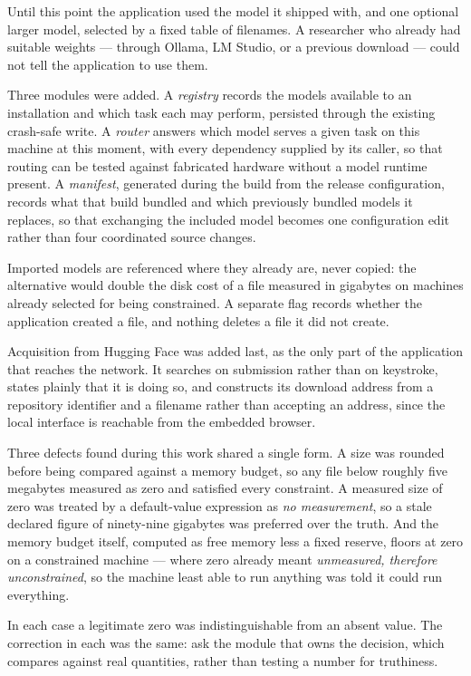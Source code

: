 \documentclass[11pt,a4paper]{article}
\begin{document}
Until this point the application used the model it shipped with, and one
optional larger model, selected by a fixed table of filenames. A researcher who
already had suitable weights --- through Ollama, LM Studio, or a previous
download --- could not tell the application to use them.

Three modules were added. A \emph{registry} records the models available to an
installation and which task each may perform, persisted through the existing
crash-safe write. A \emph{router} answers which model serves a given task on
this machine at this moment, with every dependency supplied by its caller, so
that routing can be tested against fabricated hardware without a model runtime
present. A \emph{manifest}, generated during the build from the release
configuration, records what that build bundled and which previously bundled
models it replaces, so that exchanging the included model becomes one
configuration edit rather than four coordinated source changes.

Imported models are referenced where they already are, never copied: the
alternative would double the disk cost of a file measured in gigabytes on
machines already selected for being constrained. A separate flag records
whether the application created a file, and nothing deletes a file it did not
create.

Acquisition from Hugging Face was added last, as the only part of the
application that reaches the network. It searches on submission rather than on
keystroke, states plainly that it is doing so, and constructs its download
address from a repository identifier and a filename rather than accepting an
address, since the local interface is reachable from the embedded browser.

Three defects found during this work shared a single form. A size was rounded
before being compared against a memory budget, so any file below roughly five
megabytes measured as zero and satisfied every constraint. A measured size of
zero was treated by a default-value expression as \emph{no measurement}, so a
stale declared figure of ninety-nine gigabytes was preferred over the truth.
And the memory budget itself, computed as free memory less a fixed reserve,
floors at zero on a constrained machine --- where zero already meant
\emph{unmeasured, therefore unconstrained}, so the machine least able to run
anything was told it could run everything.

In each case a legitimate zero was indistinguishable from an absent value. The
correction in each was the same: ask the module that owns the decision, which
compares against real quantities, rather than testing a number for truthiness.
\end{document}
